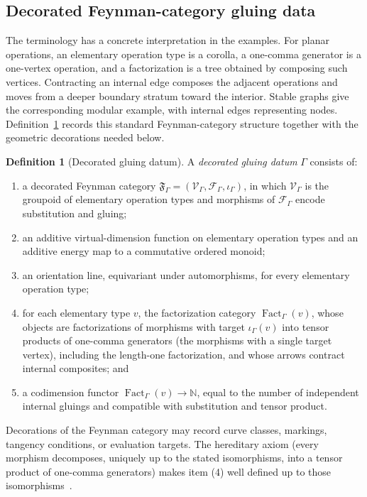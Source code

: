 \documentclass[11pt,letterpaper,twoside]{article}
\theoremstyle{plain}
\theoremstyle{definition}
\newtheorem{definition}[theorem]{Definition}
\theoremstyle{remark}
\let\cite\citep
\DeclareMathOperator{\Fact}{Fact}
\begin{document}
\subsection{Decorated Feynman-category gluing data}

The terminology has a concrete interpretation in the examples.  For planar operations, an elementary operation type is a corolla, a one-comma generator is a one-vertex operation, and a factorization is a tree obtained by composing such vertices.  Contracting an internal edge composes the adjacent operations and moves from a deeper boundary stratum toward the interior.  Stable graphs give the corresponding modular example, with internal edges representing nodes.  Definition~\ref{def:grammar} records this standard Feynman-category structure together with the geometric decorations needed below.

\begin{definition}[Decorated gluing datum]\label{def:grammar}
A \emph{decorated gluing datum} \(\Gamma\) consists of:
\begin{enumerate}
\item a decorated Feynman category \(\mathfrak F_\Gamma=(\mathcal V_\Gamma,\mathcal F_\Gamma,\iota_\Gamma)\), in which \(\mathcal V_\Gamma\) is the groupoid of elementary operation types and morphisms of \(\mathcal F_\Gamma\) encode substitution and gluing;
\item an additive virtual-dimension function on elementary operation types and an additive energy map to a commutative ordered monoid;
\item an orientation line, equivariant under automorphisms, for every elementary operation type;
\item for each elementary type \(v\), the factorization category \(\Fact_\Gamma(v)\), whose objects are factorizations of morphisms with target \(\iota_\Gamma(v)\) into tensor products of one-comma generators (the morphisms with a single target vertex), including the length-one factorization, and whose arrows contract internal composites; and
\item a codimension functor \(\Fact_\Gamma(v)\to\mathbb N\), equal to the number of independent internal gluings and compatible with substitution and tensor product.
\end{enumerate}
Decorations of the Feynman category may record curve classes, markings, tangency conditions, or evaluation targets.  The hereditary axiom (every morphism decomposes, uniquely up to the stated isomorphisms, into a tensor product of one-comma generators) makes item (4) well defined up to those isomorphisms~\cite{kaufmannward2017,kaufmannlucas2017}.  \end{definition}
\end{document}
